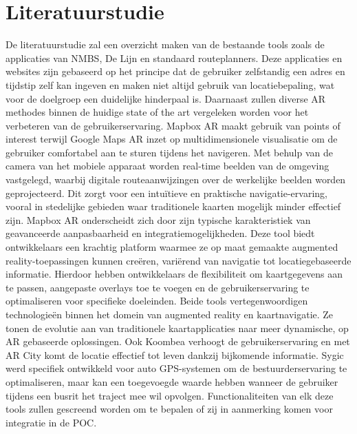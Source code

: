 \documentclass{hogent-article}
\begin{document}
    \section{Literatuurstudie}%
    \label{sec:literatuurstudie}
    
    De literatuurstudie zal een overzicht maken van de bestaande tools zoals de applicaties van NMBS, De Lijn en standaard routeplanners. Deze applicaties en websites zijn gebaseerd op het principe dat de gebruiker zelfstandig een adres en tijdstip zelf kan ingeven en maken niet altijd gebruik van locatiebepaling, wat voor de doelgroep een duidelijke hinderpaal is.
    Daarnaast zullen diverse AR methodes binnen de huidige state of the art vergeleken worden voor het verbeteren van de gebruikerservaring. Mapbox AR maakt gebruik van points of interest terwijl Google Maps AR inzet op multidimensionele visualisatie om de gebruiker comfortabel aan te sturen tijdens het navigeren. Met behulp van de camera van het mobiele apparaat worden real-time beelden van de omgeving vastgelegd, waarbij digitale routeaanwijzingen over de werkelijke beelden worden geprojecteerd. Dit zorgt voor een intuïtieve en praktische navigatie-ervaring, vooral in stedelijke gebieden waar traditionele kaarten mogelijk minder effectief zijn. 
    Mapbox AR onderscheidt zich door zijn typische karakteristiek van geavanceerde aanpasbaarheid en integratiemogelijkheden. Deze tool biedt ontwikkelaars een krachtig platform waarmee ze op maat gemaakte augmented reality-toepassingen kunnen creëren, variërend van navigatie tot locatiegebaseerde informatie. Hierdoor hebben ontwikkelaars de flexibiliteit om kaartgegevens aan te passen, aangepaste overlays toe te voegen en de gebruikerservaring te optimaliseren voor specifieke doeleinden. Beide tools vertegenwoordigen technologieën binnen het domein van augmented reality en kaartnavigatie. Ze tonen de evolutie aan van traditionele kaartapplicaties naar meer dynamische, op AR gebaseerde oplossingen.  
    Ook Koombea verhoogt de gebruikerservaring en met AR City komt de locatie effectief tot leven dankzij bijkomende informatie. Sygic werd specifiek ontwikkeld voor auto GPS-systemen om de bestuurderservaring te optimaliseren, maar kan een toegevoegde waarde hebben wanneer de gebruiker tijdens een busrit het traject mee wil opvolgen. Functionaliteiten van elk deze tools zullen gescreend worden om te bepalen of zij in aanmerking komen voor integratie in de POC. 
\end{document}
